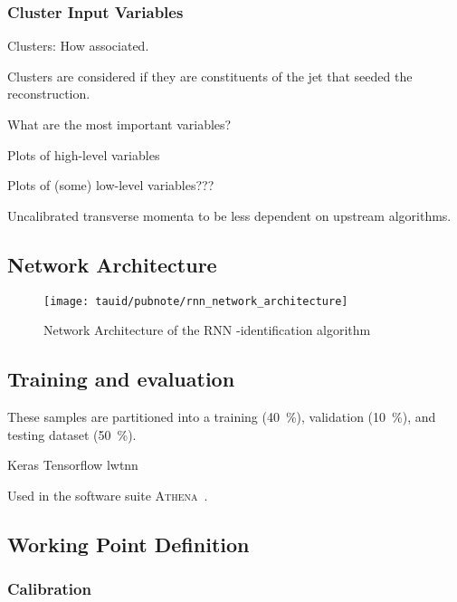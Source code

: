 \subsubsection{Cluster Input Variables}

Clusters: How associated.

Clusters are considered if they are
constituents of the jet that seeded the \tauhadvis reconstruction.





What are the most important variables?

Plots of high-level variables

Plots of (some) low-level variables???

Uncalibrated transverse momenta to be less dependent on upstream
algorithms.


\subsection{Network Architecture}

\begin{figure}[htbp]
  \centering

  \texttt{[image: tauid/pubnote/rnn\_network\_architecture]}

  \caption{Network Architecture of the RNN \tauhad-identification
    algorithm \cite{ATL-PHYS-PUB-2019-033}}
  \label{fig:tauid_network_architecture}
\end{figure}

\subsection{Training and evaluation}

These samples are partitioned into a
training (\SI{40}{\percent}), validation (\SI{10}{\percent}), and
testing dataset (\SI{50}{\percent}).

Keras Tensorflow lwtnn \cite{lwtnn,keras,tensorflow2015-whitepaper,lstm}

Used in the software suite
\textsc{Athena}~\cite{ATL-SOFT-PUB-2021-001}.

\subsection{Working Point Definition}

\subsubsection{Calibration}

